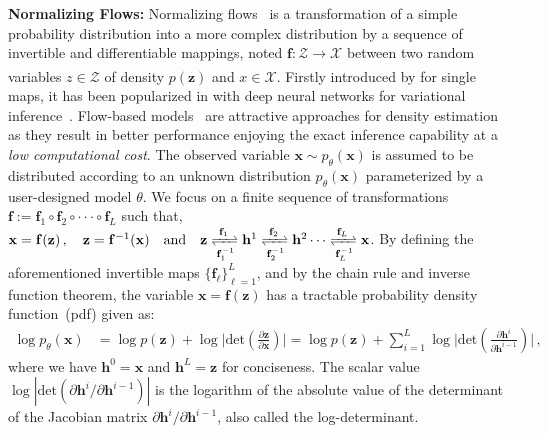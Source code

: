 \documentclass{article}
\begin{document}
\textbf{Normalizing Flows:}
Normalizing flows~\cite{kingma2018glow,rezende2015variational} is a transformation of a simple probability distribution into a more complex distribution by a sequence of invertible and differentiable mappings, noted $\mathbf{f}: \mathcal{Z} \xrightarrow[]{} \mathcal{X}$ between two random variables $z \in \mathcal{Z}$ of density $p(\mathbf{z})$ and $x \in \mathcal{X}$. 
Firstly introduced by \cite{tabak2010density} for single maps, it has been popularized in \cite{Dinh2016DensityEU,rippel2013high} with deep neural networks for variational inference~\cite{rezende2015variational}. 
Flow-based models~\cite{Dinh2016DensityEU, dinh2014nice, de2020block, ho2019flow++,papamakarios2019normalizing} are attractive approaches for density estimation as they result in better performance enjoying the exact inference capability at a \emph{low computational cost}.
The observed variable $\mathbf{x} \sim p_{\theta}(\mathbf{x})$ is assumed to be distributed according to an unknown distribution $p_{\theta}(\mathbf{x})$ parameterized by a user-designed model $\theta$. 
We focus on a finite sequence of transformations $\mathbf{f}:=\mathbf{f}_1  \circ \mathbf{f}_2 \circ   \cdot  \cdot \cdot     \circ   \mathbf{f}_L$ such that, $\mathbf{x}=\mathbf{f}(\mathbf{z})\, , \quad \mathbf{z}=\mathbf{f}^{-1}(\mathbf{x}) \quad \textrm{and} \quad
    \mathbf{z} \xrightleftharpoons[\mathbf{f}_1^{-1}]{\mathbf{f}_1} \mathbf{h}^1 \xrightleftharpoons[\mathbf{f}_2^{-1}]{\mathbf{f}_2} \mathbf{h}^2 \cdots \xrightleftharpoons[\mathbf{f}_L^{-1}]{\mathbf{f}_L}\mathbf{x}$.
By defining the aforementioned invertible maps $\{\mathbf{f}_{\ell} \}_{\ell =1}^L$, and by the chain rule and inverse function theorem, the variable $\mathbf{x}=\mathbf{f}(\mathbf{z})$ has a tractable probability density function~(pdf) given as:
\begin{align}\label{eq:flow}
\log p_{\theta}(\mathbf{x})& = \log p(\mathbf{z})  + \log \bigg| \text{det} ( \frac{\partial \mathbf{z} }{\partial \mathbf{x}} ) \bigg| 
=  \log p(\mathbf{z}) + \sum_{i=1}^L\log \bigg| \text{det} ( \frac{\partial \mathbf{h}^i } {\partial \mathbf{h}^{i-1}}) \bigg| \, ,
\end{align}%
where we have $\mathbf{h}^0 = \mathbf{x}$ and $\mathbf{h}^L = \mathbf{z}$ for conciseness. 
The scalar value $\log |\text{det}( \partial \mathbf{h}^i/\partial \mathbf{h}^{i-1})|$ is the logarithm of the absolute value of the determinant of the Jacobian matrix $\partial \mathbf{h}^i/\partial \mathbf{h}^{i-1}$, also called the log-determinant. 
\end{document}
